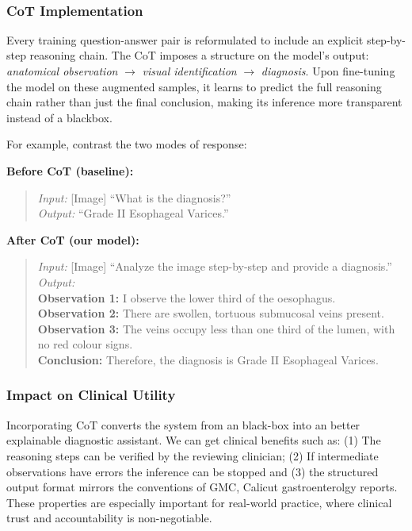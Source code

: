 ﻿﻿\documentclass[12pt]{report}
\begin{document}
\subsubsection{CoT Implementation}
Every training question-answer pair is reformulated to include an explicit step-by-step reasoning chain. The CoT imposes a structure on the model's output: \textit{anatomical observation} $\rightarrow$ \textit{visual identification} $\rightarrow$ \textit{diagnosis}. Upon fine-tuning the model on these augmented samples, it learns to predict the full reasoning chain rather than just the final conclusion, making its inference more transparent instead of a blackbox.

For example, contrast the two modes of response:

\medskip
\noindent\textbf{Before CoT (baseline):}
\begin{quote}
\textit{Input:} [Image] ``What is the diagnosis?''\\
\textit{Output:} ``Grade II Esophageal Varices.''
\end{quote}

\noindent\textbf{After CoT (our model):}
\begin{quote}
\textit{Input:} [Image] ``Analyze the image step-by-step and provide a diagnosis.''\\
\textit{Output:}\\
\textbf{Observation 1:} I observe the lower third of the oesophagus.\\
\textbf{Observation 2:} There are swollen, tortuous submucosal veins present.\\
\textbf{Observation 3:} The veins occupy less than one third of the lumen, with no red colour signs.\\
\textbf{Conclusion:} Therefore, the diagnosis is Grade II Esophageal Varices.
\end{quote}
\medskip

\subsubsection{Impact on Clinical Utility}
Incorporating CoT converts the system from an black-box into an better explainable diagnostic assistant. We can get clinical benefits such as: (1) The reasoning steps can be verified by the reviewing clinician; (2) If intermediate observations have errors the inference can be stopped and (3) the structured output format mirrors the conventions of GMC, Calicut gastroenterolgy reports. These properties are especially important for real-world practice, where clinical trust and accountability is non-negotiable.
\end{document}
